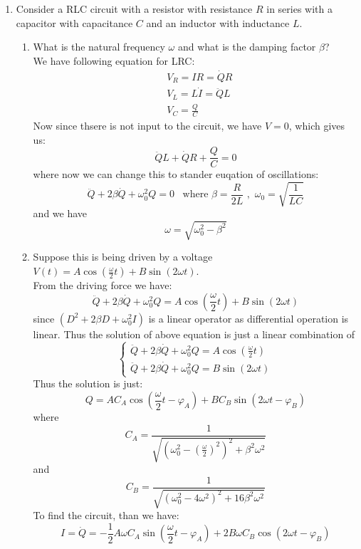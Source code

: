 \documentclass{article}
\begin{document}
\begin{enumerate}
\begin{enumerate}
    \end{enumerate}
    \item Consider a RLC circuit with a resistor with resistance $R$ in series with a capacitor with capacitance $C$ and an inductor with inductance $L$.
    \begin{enumerate}
        \item What is the natural frequency $\omega$ and what is the damping factor $\beta$? \\

        We have following equation for LRC:
        \begin{align*}
            &V_R = IR = \dot{Q}R\\
            &V_L = L\dot{I} = \ddot{Q}L\\
            &V_C = \frac{Q}{C}
        \end{align*}
        Now since thsere is not input to the circuit, we have $V = 0$, which gives us:
        \[
        \ddot{Q}L + \dot{Q}R + \frac{Q}{C} = 0
        \]
        where now we can change this to stander euqation of oscillations:
        \[
        \ddot{Q} + 2\beta\dot{Q} + \omega_0^2Q = 0 \,\,\,\,\, \text{where}\,\, \beta = \frac{R}{2L}\,\,,\,\,\omega_0 = \sqrt{\frac{1}{LC}} 
        \] 
        and we have
        \[
        \omega = \sqrt{\omega_0^2 - \beta^2}
        \]
        \item Suppose this is being driven by a voltage $V(t) = A \cos(\frac{\omega}{2}t) + B\sin(2\omega t)$. \\

        From the driving force we have:
        \[
        \ddot{Q} + 2\beta\dot{Q} + \omega_0^2Q = A \cos(\frac{\omega}{2}t) + B\sin(2\omega t)
        \]
        since $(D^2 + 2\beta D + \omega_0^2 I)$ is a linear operator as differential operation is linear. Thus the solution of above equation is just a linear combination of
        \[
        \left\{
        \begin{aligned}
        \ddot{Q} + 2\beta\dot{Q} + \omega_0^2Q = A \cos(\frac{\omega}{2}t)\\
        \ddot{Q} + 2\beta\dot{Q} + \omega_0^2Q = B\sin(2\omega t)
        \end{aligned}
        \right. 
        \] 
        Thus the solution is just:
        \[
        Q = A C_A \cos(\frac{\omega}{2}t - \varphi_A) + B C_B \sin(2\omega t - \varphi_B)
        \]
        where
        \[
        C_A = \frac{1}{\sqrt{(\omega_0^2 - (\frac{\omega}{2})^2)^2 + \beta^2\omega^2}}
        \]
        and
        \[
        C_B = \frac{1}{\sqrt{(\omega_0^2 - 4\omega^2)^2 + 16\beta^2\omega^2}}
        \]
        To find the circuit, than we have:
        \[
        I = \dot{Q} = - \frac{1}{2} A \omega C_A \sin(\frac{\omega}{2}t - \varphi_A) + 2 B \omega C_B \cos(2\omega t - \varphi_B)
        \]

    \end{enumerate}
\end{enumerate}
      




\end{document}
